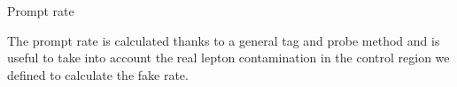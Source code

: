 \documentclass[8 pt]{beamer}
\begin{document}
\begin{frame}{Prompt rate}

	\justifying
	The prompt rate is calculated thanks to a general tag and probe method and is useful to take into account the real lepton contamination in the control region we defined to calculate the fake rate. \vfill
	
	\hspace{4pt}
	\begin{minipage}[c]{.02\linewidth}
	\begin{exampleblock}{}  \end{exampleblock}
   \end{minipage}
	\begin{minipage}[c]{.48\linewidth}
   \end{minipage} \hfill
   \begin{minipage}[c]{.48\linewidth}
   \end{minipage} \hfill
   

\end{frame}
\end{document}
